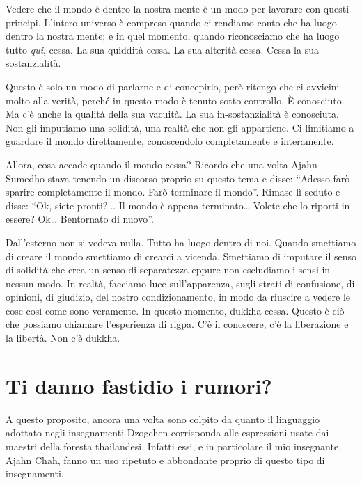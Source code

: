 Vedere che il mondo è dentro la nostra mente è un modo per lavorare con questi principi. L'intero universo è compreso quando ci rendiamo conto che ha luogo dentro la nostra mente; e in quel momento, quando riconosciamo che ha luogo tutto \textit{qui}, cessa. La sua quiddità cessa. La sua alterità cessa. Cessa la sua sostanzialità.

Questo è solo un modo di parlarne e di concepirlo, però ritengo che ci avvicini molto alla verità, perché in questo modo è tenuto sotto controllo. È conosciuto. Ma c'è anche la qualità della sua vacuità. La sua in-sostanzialità è conosciuta. Non gli imputiamo una solidità, una realtà che non gli appartiene. Ci limitiamo a guardare il mondo direttamente, conoscendolo completamente e interamente.

Allora, cosa accade quando il mondo cessa? Ricordo che una volta Ajahn Sumedho stava tenendo un discorso proprio su questo tema e disse: ``Adesso farò sparire completamente il mondo. Farò terminare il mondo''. Rimase lì seduto e disse: ``Ok, siete pronti?... Il mondo è appena terminato\ldots{} Volete che lo riporti in essere? Ok\ldots{} Bentornato di nuovo''.

Dall'esterno non si vedeva nulla. Tutto ha luogo dentro di noi. Quando smettiamo di creare il mondo smettiamo di crearci a vicenda. Smettiamo di imputare il senso di solidità che crea un senso di separatezza eppure non escludiamo i sensi in nessun modo. In realtà, facciamo luce sull'apparenza, sugli strati di confusione, di opinioni, di giudizio, del nostro condizionamento, in modo da riuscire a vedere le cose così come sono veramente. In questo momento, dukkha cessa. Questo è ciò che possiamo chiamare l'esperienza di rigpa. C'è il conoscere, c'è la liberazione e la libertà. Non c'è dukkha.

\vspace*{-1.2em}
\section*{Ti danno fastidio i rumori?}

\vspace*{-0.8em}
A questo proposito, ancora una volta sono colpito da quanto il linguaggio adottato negli insegnamenti Dzogchen corrisponda alle espressioni usate dai maestri della foresta thailandesi. Infatti essi, e in particolare il mio insegnante, Ajahn Chah, fanno un uso ripetuto e abbondante proprio di questo tipo di insegnamenti. 

